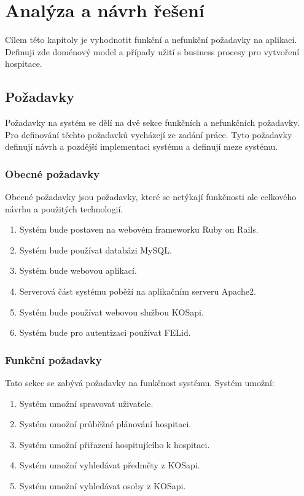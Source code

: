 \chapter{Analýza a návrh řešení}
Cílem této kapitoly je vyhodnotit funkční a nefunkční požadavky na aplikaci. Definuji zde doménový model a případy užití s business procesy pro vytvoření hospitace. 

\section{Požadavky}
Požadavky na systém se dělí na dvě sekce funkčních a nefunkčních požadavky. Pro definování těchto požadavků vycházejí ze zadání práce. Tyto požadavky definují návrh a pozdější implementaci systému a definují meze systému.
\subsection{Obecné požadavky}
Obecné požadavky jsou požadavky, které se netýkají funkčnosti ale celkového návrhu a použitých technologií.
\begin{enumerate}
\item Systém bude postaven na webovém frameworku Ruby on Rails.
\item Systém bude používat databázi MySQL.
\item Systém bude webovou aplikací.
\item Serverová část systému poběží na aplikačním serveru Apache2.
\item Systém bude používat webovou službou KOSapi.
\item Systém bude pro autentizaci používat FELid.
\end{enumerate}

\subsection{Funkční požadavky}
Tato sekce se zabývá požadavky na funkčnost systému. Systém umožní:
\begin{enumerate}
\item Systém umožní spravovat uživatele.
\item Systém umožní průběžné plánování hospitaci.
\item Systém umožní přiřazení hospitujícího k hospitaci.
\item Systém umožní vyhledávat předměty z KOSapi.
\item Systém umožní vyhledávat osoby z KOSapi.
\end{enumerate}

